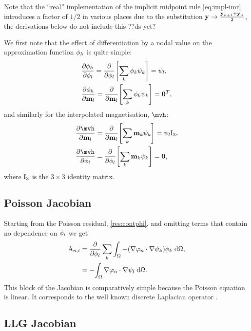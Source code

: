 {Note that the ``real'' implementation of the implicit midpoint rule \cref{eq:impl-imr} introduces a factor of $1/2$ in various places due to the substitution $ \boldsymbol{\mathrm{y}} \rightarrow \frac{\boldsymbol{\mathrm{y}}_{n+1} + \boldsymbol{\mathrm{y}}_n}{2}$, the derivations below do not include this ??ds yet?

We first note that the effect of differentiation by a nodal value on the approximation function ${\phi}_h$ is quite simple:
\begin{equation}
  \begin{aligned}
    &\frac{\partial {\phi}_h}{\partial \phi_l} = \frac{\partial }{\partial \phi_l} {\left[  \sum_k \phi_k {\psi_k}  \right]} = \psi_l, \\
    &\frac{\partial {\phi}_h}{\partial \boldsymbol{\mathrm{m}}_l} = \frac{\partial }{\partial \boldsymbol{\mathrm{m}}_l} {\left[  \sum_k \phi_k {\psi_k}  \right]} = \mathbf{0}^T, \\
  \end{aligned}
\end{equation}
and similarly for the interpolated magnetisation, $\mvh$:
\begin{equation}
  \begin{aligned}
    &\pd{\mvh}{\mv_l} = \pd{}{\mv_l} \bigs{ \sum_k \mv_k \sk } = \sbf_l \Idm_3, \\
    &\pd{\mvh}{\phim_l} = \pd{}{\phim_l} \bigs{ \sum_k \mv_k \sk } = \zerov, \\
\end{aligned}
\end{equation}
where $\mathrm{I}_3$ is the $3\times3$ identity matrix.

\subsection{Poisson Jacobian}
\label{sec:poisson-jacobian}

Starting from the Poisson residual, \cref{res:contphi}, and omitting terms that contain no dependence on $\phi_i$ we get
\begin{equation}
  \begin{aligned}
    \label{eq:poisson-jacobian}
    \mathrm{A}_{n,l} &= \frac{\partial }{\partial \phi_{l}} \sum_k {\int_{\Omega} { -(\nabla \varphi_n \cdot \nabla \psi_k) \phi_{k}} {\; \mathrm{{d}}} {\Omega}}, \\
    &= -{\int_{\Omega} {\nabla \varphi_n \cdot \nabla \psi_l} {\; \mathrm{{d}}} {\Omega}}.
  \end{aligned}
\end{equation}
This block of the Jacobian is comparatively simple because the Poisson equation is linear.
It corresponds to the well known discrete Laplacian operator \cite{HowardElmanDavidSilvester2006}.


\subsection{LLG Jacobian}
\label{sec:llg-jacobian}

}
